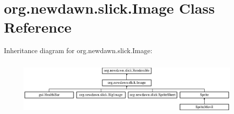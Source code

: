 \hypertarget{classorg_1_1newdawn_1_1slick_1_1_image}{}\section{org.\+newdawn.\+slick.\+Image Class Reference}
\label{classorg_1_1newdawn_1_1slick_1_1_image}
Inheritance diagram for org.\+newdawn.\+slick.\+Image\+:\begin{figure}[H]
\begin{center}
\leavevmode
\includegraphics[height=2.886598cm]{classorg_1_1newdawn_1_1slick_1_1_image}
\end{center}
\end{figure}

